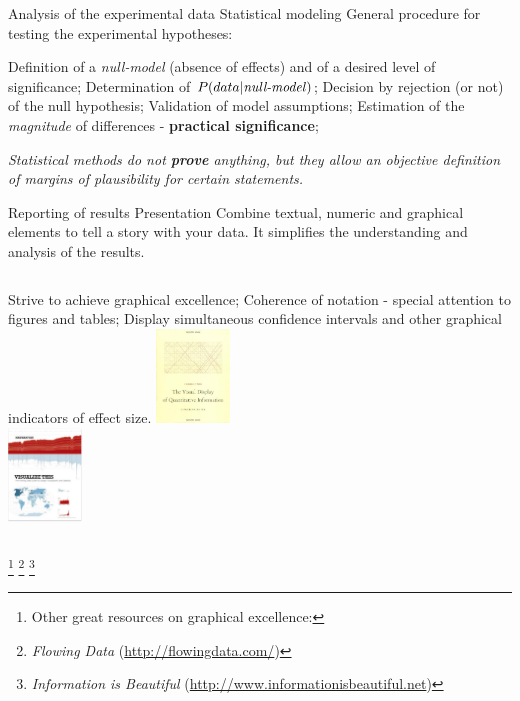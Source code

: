 \documentclass[t]{beamer}
\begin{document}

\begin{ftst}
{Analysis of the experimental data}
{Statistical modeling}
\bitems General procedure for testing the experimental hypotheses:

	\bitems Definition of a \textit{null-model} (absence of effects) and of a desired level of significance;
		\spitem Determination of $P(data|\mbox{\textit{null-model}})$;
		\spitem Decision by rejection (or not) of the null hypothesis;
		\spitem Validation of model assumptions;
		\spitem Estimation of the  \textit{magnitude} of differences - \textbf{practical significance};
	\eitem
\eitem

\begin{block}{}
	\centering\textit{Statistical methods do not \textbf{prove} anything, but they allow an objective definition of margins of plausibility for certain statements.}
\end{block}
\end{ftst}


\begin{ftst}
{Reporting of results}
{Presentation}
Combine textual, numeric and graphical elements to tell a story with your data. It simplifies the understanding and analysis of the results.
\begin{columns}[T]
	\bitems Strive to achieve graphical excellence;
		\spitem Coherence of notation - special attention to figures and tables;
		\spitem Display simultaneous confidence intervals and other graphical indicators of effect size.
	\eitem
{}
	\centering\includegraphics[height=2.5cm]{../figs/tufte.jpg}\\
	\vone
	\centering\includegraphics[height=2.5cm]{../figs/yau.png}
\end{columns}
\let\thefootnote\relax\footnote{\tiny Other great resources on graphical excellence:}
\let\thefootnote\relax\footnote{\tiny \textit{Flowing Data} (\url{http://flowingdata.com/})}
\let\thefootnote\relax\footnote{\tiny \textit{Information is Beautiful} (\url{http://www.informationisbeautiful.net})}
\end{ftst}
\end{document}
